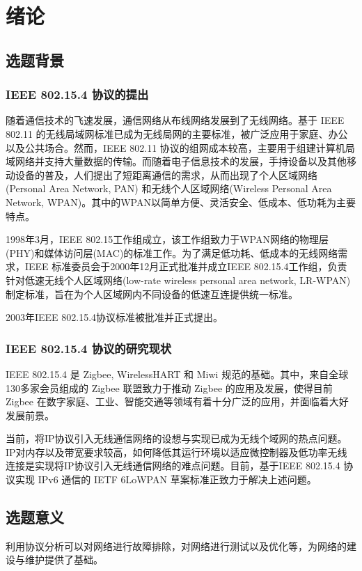 \chapter{绪论}
\section{选题背景}
\subsection{IEEE 802.15.4 协议的提出}

随着通信技术的飞速发展，通信网络从布线网络发展到了无线网络。基于 IEEE 802.11 的无线局域网标准已成为无线局网的主要标准，被广泛应用于家庭、办公以及公共场合。然而，IEEE 802.11 协议的组网成本较高，主要用于组建计算机局域网络并支持大量数据的传输。而随着电子信息技术的发展，手持设备以及其他移动设备的普及，人们提出了短距离通信的需求，从而出现了个人区域网络(Personal Area Network, PAN) 和无线个人区域网络(Wireless Personal Area Network, WPAN)。其中的WPAN以简单方便、灵活安全、低成本、低功耗为主要特点。

1998年3月，IEEE 802.15工作组成立，该工作组致力于WPAN网络的物理层(PHY)和媒体访问层(MAC)的标准工作。为了满足低功耗、低成本的无线网络需求，IEEE 标准委员会于2000年12月正式批准并成立IEEE 802.15.4工作组，负责针对低速无线个人区域网络(low-rate wireless personal area network, LR-WPAN)制定标准，旨在为个人区域网内不同设备的低速互连提供统一标准。

2003年IEEE 802.15.4协议标准被批准并正式提出。

\subsection{IEEE 802.15.4 协议的研究现状}
IEEE 802.15.4 是 Zigbee, WirelessHART 和 Miwi 规范的基础。其中，来自全球130多家会员组成的 Zigbee 联盟致力于推动 Zigbee 的应用及发展，使得目前 Zigbee 在数字家庭、工业、智能交通等领域有着十分广泛的应用，并面临着大好发展前景。

当前，将IP协议引入无线通信网络的设想与实现已成为无线个域网的热点问题。IP对内存以及带宽要求较高，如何降低其运行环境以适应微控制器及低功率无线连接是实现将IP协议引入无线通信网络的难点问题。目前，基于IEEE 802.15.4 协议实现 IPv6 通信的 IETF 6LoWPAN 草案标准正致力于解决上述问题。

\section{选题意义}
利用协议分析可以对网络进行故障排除，对网络进行测试以及优化等，为网络的建设与维护提供了基础。

